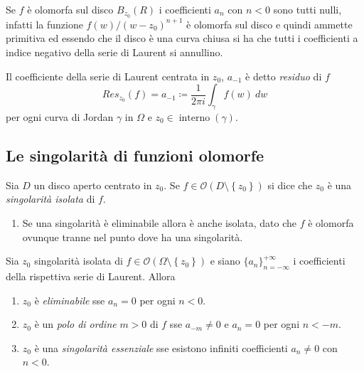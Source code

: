 \begin{remark}
  Se $f$ è olomorfa sul disco $B_{z_0}(R)$ i coefficienti $a_n$ con $n < 0$ sono
  tutti nulli, infatti la funzione $f(w) / (w-z_0)^{n+1}$ è olomorfa sul disco
  e quindi ammette primitiva ed essendo che il disco è una curva chiusa si ha
  che tutti i coefficienti a indice negativo della serie di Laurent si
  annullino.
  \label{rmk:coefficienti_negativi}
\end{remark}

\begin{definition}
  Il coefficiente della serie di Laurent centrata in $z_0$, $a_{-1}$ è detto \emph{residuo} di $f$
  \begin{equation*}
    Res_{z_0}(f) =  a_{-1} \coloneqq \frac{1}{2\pi i} \int_{\gamma} f(w)\ dw
  \end{equation*}
  per ogni curva di Jordan $\gamma$ in $\Omega$ e $z_0 \in
  \operatorname{interno}(\gamma)$.
  \label{def:residuo}
\end{definition}

\subsection{\textcolor{AnComp}{\textbf{Le singolarità di funzioni olomorfe}}}

\begin{definition}
  Sia $D$ un disco aperto centrato in $z_0$. Se $f \in \mathcal{O}(D \setminus
  \left\{ z_0 \right\})$ si dice che $z_0$ è una \emph{singolarità isolata} di
  $f$.
  \label{def:singolarità_isolata}
\end{definition}

\begin{example}
  \begin{enumerate}
    \item Se una singolarità è eliminabile allora è anche isolata, dato che $f$
      è olomorfa ovunque tranne nel punto dove ha una singolarità.
  \end{enumerate}
\end{example}

\begin{definition}
  Sia $z_0$ singolarità isolata di $f \in \mathcal{O}(\Omega \setminus \left\{
  z_0 \right\})$ e siano $\{a_n\}_{n=-\infty}^{+\infty}$ i coefficienti della
  rispettiva serie di Laurent. Allora
  \begin{enumerate}
    \item $z_0$ è \emph{eliminabile} sse $a_n = 0$ per ogni $n < 0$.
    \item $z_0$ è un \emph{polo di ordine} $m > 0$ di $f$ sse $a_{-m} \neq 0$ e $a_n
      = 0$ per ogni $n < -m$.
    \item $z_0$ è una \emph{singolarità essenziale} sse esistono infiniti coefficienti
      $a_n \neq 0$ con $n < 0$.
  \end{enumerate}
  \label{def:classificazione_singolarita_per_serie_di_laurent}
\end{definition}

